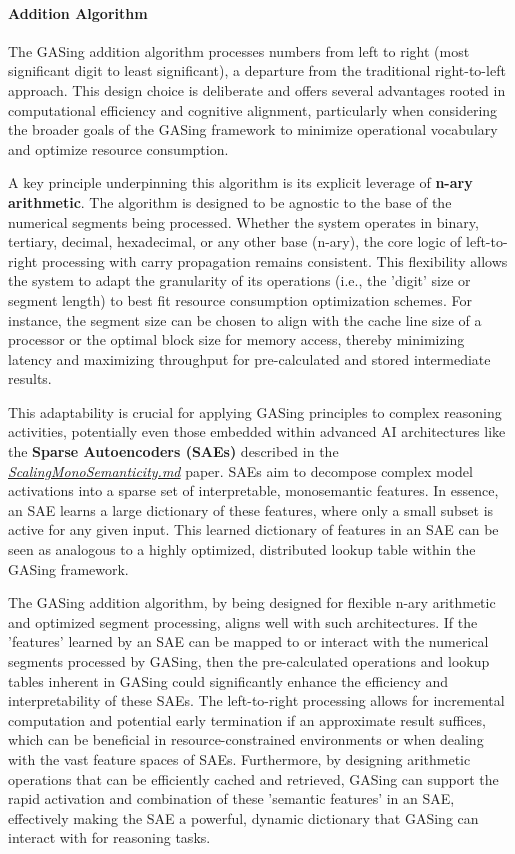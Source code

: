 \paragraph{Addition Algorithm}

The GASing addition algorithm processes numbers from left to right (most significant digit to least significant), a departure from the traditional right-to-left approach. This design choice is deliberate and offers several advantages rooted in computational efficiency and cognitive alignment, particularly when considering the broader goals of the GASing framework to minimize operational vocabulary and optimize resource consumption.

A key principle underpinning this algorithm is its explicit leverage of \textbf{n-ary arithmetic}. The algorithm is designed to be agnostic to the base of the numerical segments being processed. Whether the system operates in binary, tertiary, decimal, hexadecimal, or any other base (n-ary), the core logic of left-to-right processing with carry propagation remains consistent. This flexibility allows the system to adapt the granularity of its operations (i.e., the 'digit' size or segment length) to best fit resource consumption optimization schemes. For instance, the segment size can be chosen to align with the cache line size of a processor or the optimal block size for memory access, thereby minimizing latency and maximizing throughput for pre-calculated and stored intermediate results.

This adaptability is crucial for applying GASing principles to complex reasoning activities, potentially even those embedded within advanced AI architectures like the \textbf{Sparse Autoencoders (SAEs)} described in the \textit{\href{file://\/Users/bkoo/Documents/Development/AIProjects/GASing\_PKM/docs/references/ScalingMonoSemanticity.md}{ScalingMonoSemanticity.md}} paper. SAEs aim to decompose complex model activations into a sparse set of interpretable, monosemantic features. In essence, an SAE learns a large dictionary of these features, where only a small subset is active for any given input. This learned dictionary of features in an SAE can be seen as analogous to a highly optimized, distributed lookup table within the GASing framework. 

The GASing addition algorithm, by being designed for flexible n-ary arithmetic and optimized segment processing, aligns well with such architectures. If the 'features' learned by an SAE can be mapped to or interact with the numerical segments processed by GASing, then the pre-calculated operations and lookup tables inherent in GASing could significantly enhance the efficiency and interpretability of these SAEs. The left-to-right processing allows for incremental computation and potential early termination if an approximate result suffices, which can be beneficial in resource-constrained environments or when dealing with the vast feature spaces of SAEs. Furthermore, by designing arithmetic operations that can be efficiently cached and retrieved, GASing can support the rapid activation and combination of these 'semantic features' in an SAE, effectively making the SAE a powerful, dynamic dictionary that GASing can interact with for reasoning tasks.

